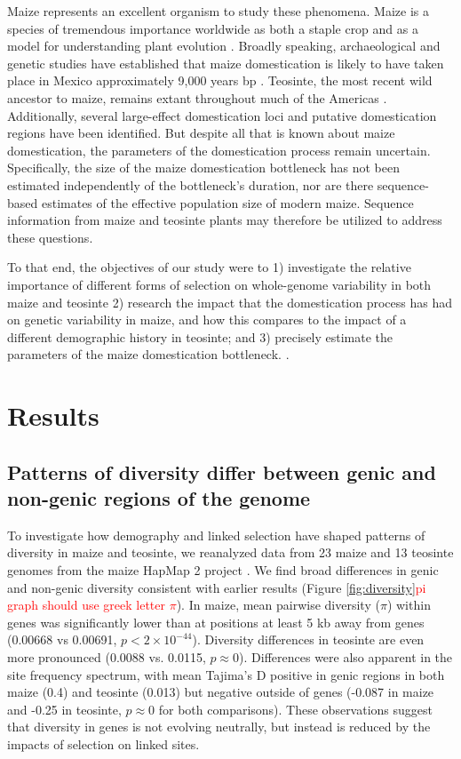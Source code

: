 \documentclass{pnastwo}
\newcommand{\jri}[1]{\textcolor{red}{\scriptsize #1}}
\begin{document}
\begin{article}
Maize represents an excellent organism to study these
phenomena. Maize is a species of tremendous importance worldwide as
both a staple crop \cite{shiferaw2011} and as a model for
understanding plant evolution \cite{strable2009}. Broadly speaking, archaeological and genetic studies have
established that maize domestication is likely to have taken place in
 Mexico approximately 9,000 years bp
\cite{smith1995,matsuoka2002}. Teosinte, the most
recent wild ancestor to maize, remains extant throughout much of the
Americas \cite{wilkes1967}. Additionally, several large-effect
domestication loci \cite{doebley1995, wills2013, wang2015} and putative domestication
regions \cite{hufford2012} have been identified. But despite all that is
known about maize domestication, the parameters of the
domestication process remain uncertain. Specifically, the size of the
maize domestication bottleneck has not been estimated independently of
the bottleneck's duration, nor are there sequence-based estimates of the effective
population size of modern maize. Sequence information from maize and
teosinte plants may therefore be utilized to address these questions.

To that end, the objectives of our study were to 1) investigate the
relative importance of different forms of selection on whole-genome
variability in both maize and teosinte 2) research the impact that the
domestication process has had on genetic variability in maize, and how
this compares to the impact of a different demographic history in
teosinte; and 3) precisely estimate the parameters of the
maize domestication bottleneck.  \cite{chia2012}.

\section{Results}
\subsection{Patterns of diversity differ between genic and  non-genic regions of the genome}
To investigate how demography and linked selection have shaped patterns of diversity in maize and teosinte, we reanalyzed data from 23 maize and 13 teosinte genomes from the maize HapMap 2 project \cite{chia2012}.
We find broad differences in genic and non-genic diversity consistent with earlier results  \cite{hufford2012} (Figure \ref{fig:diversity}\jri{pi graph should use greek letter $\pi$}).  
In maize, mean pairwise diversity ($\pi$) within genes was significantly lower than at positions at least 5 kb away from genes (0.00668 vs 0.00691, $p<2\times 10^{-44}$). 
Diversity differences in teosinte are even more pronounced (0.0088 vs. 0.0115, $p\approx 0$). 
Differences were also apparent in the site frequency spectrum, with mean Tajima's D positive in genic regions in both maize (0.4) and teosinte (0.013) but negative outside of genes (-0.087 in maize and -0.25 in teosinte, $p\approx 0$ for both comparisons).
These observations suggest that diversity in genes is not evolving neutrally, but instead is reduced by the impacts of selection on linked sites. 



\end{article}
\end{document}
